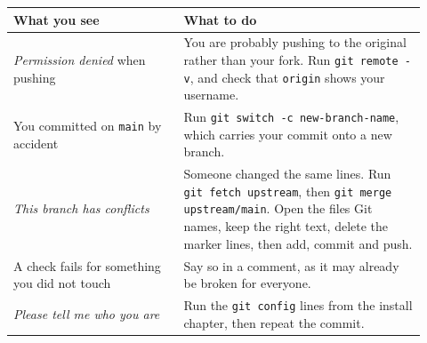 \begin{longtable}{p{0.38\linewidth}p{0.54\linewidth}}
\toprule
What you see & What to do \\
\midrule
\emph{Permission denied} when pushing & You are probably pushing to the original rather than your fork. Run \texttt{git remote -v}, and check that \texttt{origin} shows your username. \\
You committed on \texttt{main} by accident & Run \texttt{git switch -c new-branch-name}, which carries your commit onto a new branch. \\
\emph{This branch has conflicts} & Someone changed the same lines. Run \texttt{git fetch upstream}, then \texttt{git merge upstream/main}. Open the files Git names, keep the right text, delete the marker lines, then add, commit and push. \\
A check fails for something you did not touch & Say so in a comment, as it may already be broken for everyone. \\
\emph{Please tell me who you are} & Run the \texttt{git config} lines from the install chapter, then repeat the commit. \\
\bottomrule
\end{longtable}
